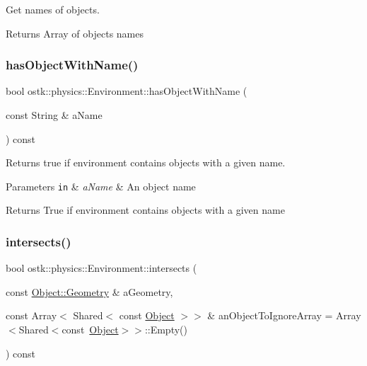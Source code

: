 Get names of objects. 

\begin{DoxyReturn}{Returns}
Array of objects names 
\end{DoxyReturn}
\mbox{\label{classostk_1_1physics_1_1_environment_af83819fdcd1586e185ce21e92ce574ed}} 
\subsubsection{\texorpdfstring{has\+Object\+With\+Name()}{hasObjectWithName()}}
{\footnotesize\ttfamily bool ostk\+::physics\+::\+Environment\+::has\+Object\+With\+Name (\begin{DoxyParamCaption}\item[{const String \&}]{a\+Name }\end{DoxyParamCaption}) const}



Returns true if environment contains objects with a given name. 


\begin{DoxyParams}[1]{Parameters}
\mbox{\tt in}  & {\em a\+Name} & An object name \\
\hline
\end{DoxyParams}
\begin{DoxyReturn}{Returns}
True if environment contains objects with a given name 
\end{DoxyReturn}
\mbox{\label{classostk_1_1physics_1_1_environment_a9a720fa8e7f4b2a30721280a0081716c}} 
\subsubsection{\texorpdfstring{intersects()}{intersects()}}
{\footnotesize\ttfamily bool ostk\+::physics\+::\+Environment\+::intersects (\begin{DoxyParamCaption}\item[{const \hyperlink{classostk_1_1physics_1_1env_1_1_object_a66e44a65aefb23a184a6de531e96935d}{Object\+::\+Geometry} \&}]{a\+Geometry,  }\item[{const Array$<$ Shared$<$ const \hyperlink{classostk_1_1physics_1_1env_1_1_object}{Object} $>$$>$ \&}]{an\+Object\+To\+Ignore\+Array = {\ttfamily Array$<$Shared$<$const~\hyperlink{classostk_1_1physics_1_1env_1_1_object}{Object}$>$$>$\+:\+:Empty()} }\end{DoxyParamCaption}) const}



